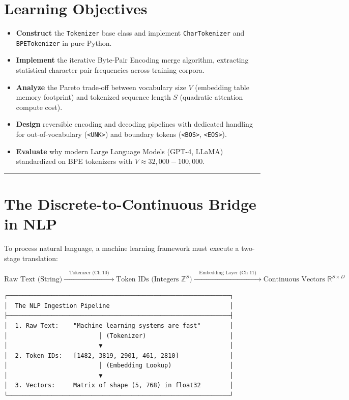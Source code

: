 \documentclass[
  letterpaper,
]{scrbook}
\providecommand{\tightlist}{%
  \setlength{\itemsep}{0pt}\setlength{\parskip}{0pt}}
\begin{document}
\section{Learning Objectives}\label{learning-objectives-10}

\begin{itemize}
\tightlist
\item
  \textbf{Construct} the \texttt{Tokenizer} base class and implement
  \texttt{CharTokenizer} and \texttt{BPETokenizer} in pure Python.
\item
  \textbf{Implement} the iterative Byte-Pair Encoding merge algorithm,
  extracting statistical character pair frequencies across training
  corpora.
\item
  \textbf{Analyze} the Pareto trade-off between vocabulary size \(V\)
  (embedding table memory footprint) and tokenized sequence length \(S\)
  (quadratic attention compute cost).
\item
  \textbf{Design} reversible encoding and decoding pipelines with
  dedicated handling for out-of-vocabulary
  (\texttt{\textless{}UNK\textgreater{}}) and boundary tokens
  (\texttt{\textless{}BOS\textgreater{}},
  \texttt{\textless{}EOS\textgreater{}}).
\item
  \textbf{Evaluate} why modern Large Language Models (GPT-4, LLaMA)
  standardized on BPE tokenizers with \(V \approx 32,000 - 100,000\).
\end{itemize}

\begin{center}\rule{0.5\linewidth}{0.5pt}\end{center}

\section{The Discrete-to-Continuous Bridge in
NLP}\label{the-discrete-to-continuous-bridge-in-nlp}

To process natural language, a machine learning framework must execute a
two-stage translation:

\[\text{Raw Text (String)} \xrightarrow{\quad \text{Tokenizer (Ch 10)} \quad} \text{Token IDs (Integers } \mathbb{Z}^S \text{)} \xrightarrow{\quad \text{Embedding Layer (Ch 11)} \quad} \text{Continuous Vectors } \mathbb{R}^{S \times D}\]

\begin{verbatim}
┌─────────────────────────────────────────────────────────────┐
│  The NLP Ingestion Pipeline                                 │
├─────────────────────────────────────────────────────────────┤
│  1. Raw Text:    "Machine learning systems are fast"        │
│                         │ (Tokenizer)                       │
│                         ▼                                   │
│  2. Token IDs:   [1482, 3819, 2901, 461, 2810]              │
│                         │ (Embedding Lookup)                │
│                         ▼                                   │
│  3. Vectors:     Matrix of shape (5, 768) in float32        │
└─────────────────────────────────────────────────────────────┘
\end{verbatim}
\end{document}
